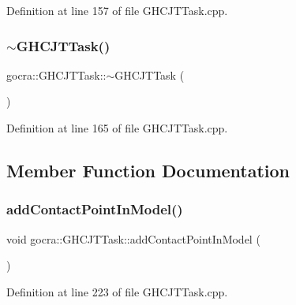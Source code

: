 Definition at line 157 of file G\+H\+C\+J\+T\+Task.\+cpp.

\hypertarget{classgocra_1_1GHCJTTask_a258ac19e0b4a3aab26b4aebfeb2c26d8}{}\label{classgocra_1_1GHCJTTask_a258ac19e0b4a3aab26b4aebfeb2c26d8} 
\subsubsection{\texorpdfstring{$\sim$\+G\+H\+C\+J\+T\+Task()}{~GHCJTTask()}}
{\footnotesize\ttfamily gocra\+::\+G\+H\+C\+J\+T\+Task\+::$\sim$\+G\+H\+C\+J\+T\+Task (\begin{DoxyParamCaption}{ }\end{DoxyParamCaption})\hspace{0.3cm}{\ttfamily [virtual]}}



Definition at line 165 of file G\+H\+C\+J\+T\+Task.\+cpp.



\subsection{Member Function Documentation}
\hypertarget{classgocra_1_1GHCJTTask_aee61104908f043c77611e2b3b573d103}{}\label{classgocra_1_1GHCJTTask_aee61104908f043c77611e2b3b573d103} 
\subsubsection{\texorpdfstring{add\+Contact\+Point\+In\+Model()}{addContactPointInModel()}}
{\footnotesize\ttfamily void gocra\+::\+G\+H\+C\+J\+T\+Task\+::add\+Contact\+Point\+In\+Model (\begin{DoxyParamCaption}{ }\end{DoxyParamCaption})\hspace{0.3cm}{\ttfamily [protected]}}



Definition at line 223 of file G\+H\+C\+J\+T\+Task.\+cpp.

